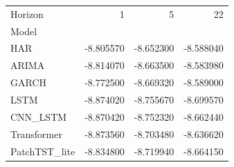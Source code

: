 \begin{tabular}{lrrr}
\toprule
Horizon & 1 & 5 & 22 \\
Model &  &  &  \\
\midrule
HAR & -8.805570 & -8.652300 & -8.588040 \\
ARIMA & -8.814070 & -8.663500 & -8.583980 \\
GARCH & -8.772500 & -8.669320 & -8.589000 \\
LSTM & -8.874020 & -8.755670 & -8.699570 \\
CNN_LSTM & -8.870420 & -8.752320 & -8.662440 \\
Transformer & -8.873560 & -8.703480 & -8.636620 \\
PatchTST_lite & -8.834800 & -8.719940 & -8.664150 \\
\bottomrule
\end{tabular}
